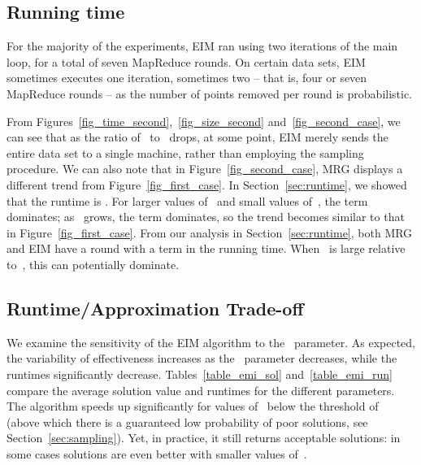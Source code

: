 \documentclass[11pt]{article}
\newcommand{\ours}{{\sc MRG}\xspace}
\newcommand{\ene}{{\sc EIM}\xspace}
\begin{document}
\subsection{Running time}
For the majority of the experiments, \ene ran using two iterations of the main loop, for a total of seven MapReduce rounds.
On certain data sets,
\ene sometimes executes one iteration, sometimes two --
that is, four or seven
MapReduce rounds
 -- as the number of points removed per round is probabilistic.






From Figures~\ref{fig_time_second},~\ref{fig_size_second}
and~\ref{fig_second_case}, we can see that as the ratio of~ to~
drops, at some point, \ene merely sends the entire data set to a single
machine, rather than employing the sampling procedure.
We can also note that in Figure~\ref{fig_second_case}, \ours displays a different trend from Figure~\ref{fig_first_case}.
In Section~\ref{sec:runtime}, we showed that the runtime is . 
For larger values of~ and small values of~, the  term
dominates;
as~ grows, the  term dominates,
so the trend becomes similar to that in Figure~\ref{fig_first_case}. 
From our analysis in Section~\ref{sec:runtime}, both \ours and \ene have a
round with a  term in the running time.
When~ is large relative to~,
this can potentially dominate.




 


\subsection{Runtime/Approximation Trade-off }

We examine the sensitivity of the \ene algorithm to the~ parameter.
As expected, the variability of effectiveness increases
as the~ parameter decreases,
while the runtimes significantly decrease. 
Tables~\ref{table_emi_sol} and~\ref{table_emi_run} compare
the average solution value and runtimes for the different parameters. 
The algorithm speeds up significantly 
for values of~ below the threshold of~ (above which there is a
guaranteed low probability of poor solutions, see Section~\ref{sec:sampling}).
Yet, in practice, it still returns acceptable solutions:
in some cases solutions are even better with smaller values of~.
\end{document}
